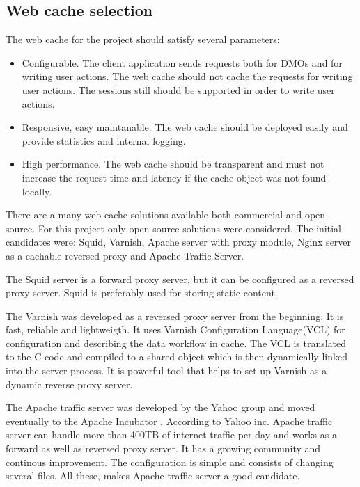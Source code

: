 
\subsection{Web cache selection}

The web cache for the project should satisfy several parameters:
\begin{itemize}
	\item Configurable. The client application sends requests both for DMOs and for writing user actions. The web cache should not cache the requests for writing user actions. The sessions still should be supported in order to write user actions. 
	\item Responsive, easy maintanable. The web cache should be deployed easily and provide statistics and internal logging. 
	\item High performance. The web cache should be transparent and must not increase the request time and latency if the cache object was not found locally. 
\end{itemize}

There are a many web cache solutions available both commercial and open source. For this project only open source solutions were considered. The initial candidates were: Squid, Varnish, Apache server with proxy module, Nginx server as a cachable reversed proxy and Apache Traffic Server.

The Squid server is a forward proxy server, but it can be configured as a reversed proxy server. Squid is preferably used for storing static content.

The Varnish was developed as a reversed proxy server from the beginning. It is fast, reliable and lightweigth. It uses Varnish Configuration Language(VCL) for configuration and describing the data workflow in cache. The VCL is translated to the C code and compiled to a shared object which is then dynamically linked into the server process. It is powerful tool that helps to set up Varnish as a dynamic reverse proxy server.

The Apache traffic server was developed by the Yahoo group and moved eventually to the Apache Incubator \cite{GuApacheTrafficUri}. According to Yahoo inc. Apache traffic server can handle more than 400TB of internet traffic per day and works as a forward as well as reversed proxy server. It has a growing community and continous improvement. The configuration is simple and consists of changing several files. All these, makes Apache traffic server a good candidate.  

